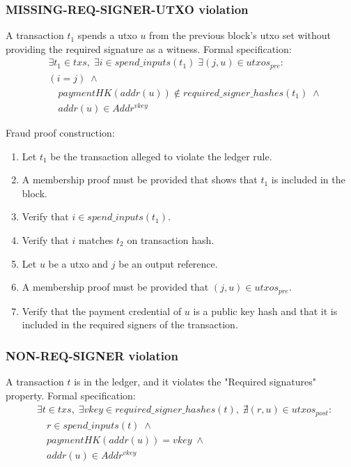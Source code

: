 \documentclass[../midgard.tex]{subfiles}
\begin{document}
\subsubsection{MISSING-REQ-SIGNER-UTXO violation}
\label{violation:MISSING-REQ-SIGNER-UTXO}
A transaction $t_1$ spends a utxo $u$ from the previous block's utxo set without providing the required signature as a witness.
Formal specification:
\begin{equation*}
\begin{split}
  &\exists t_1 \in txs,\; \exists i \in spend\_inputs(t_1)\; \exists (j,u) \in utxos_{pre} : \\
    &(i = j) \;\land\\
    &\quad paymentHK(addr(u)) \notin required\_signer\_hashes(t_1) \;\land\\
    &\quad addr(u) \in Addr^{vkey}
\end{split}
\end{equation*}

Fraud proof construction:
\begin{enumerate}
  \item Let $t_1$ be the transaction alleged to violate the ledger rule. 
  \item A membership proof must be provided that shows that $t_1$ is included in the block.
  \item Verify that $i \in spend\_inputs(t_1)$.
  \item Verify that $i$ matches $t_2$ on transaction hash. 
  \item Let $u$ be a utxo and $j$ be an output reference. 
  \item A membership proof must be provided that $(j,u) \in utxos_{pre}$.
  \item Verify that the payment credential of $u$ is a public key hash and that it is included in the required signers of the transaction.
\end{enumerate}

\subsubsection{NON-REQ-SIGNER violation}
\label{violation:NON-REQ-SIGNER}
A transaction $t$ is in the ledger, and it violates the "Required signatures" property.
Formal specification:
\begin{equation*}
\begin{split}
  &\exists t \in txs,\; \exists vkey \in required\_signer\_hashes(t),\;
    \nexists (r, u) \in utxos_{post}: \\
    &\quad r \in spend\_inputs(t) \;\land\\
    &\quad paymentHK(addr(u)) = vkey \;\land\\
    &\quad addr(u) \in Addr^{vkey}
\end{split}
\end{equation*}
\end{document}
